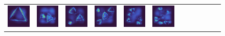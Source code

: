 \documentclass[letterpaper]{article} %
\begin{document}
\begin{figure}[!htbp]
\begin{tabular}{cccccccccccc}
\multicolumn{1}{c}{\includegraphics[width=0.125\columnwidth]{saliency/ce/circle/triangle_1.png}} \hspace{-12pt} &  \multicolumn{1}{c}{\includegraphics[width=0.125\columnwidth]{saliency/ce/circle/triangle_2.png}} \hspace{-12pt} & \multicolumn{1}{c}{\includegraphics[width=0.125\columnwidth]{saliency/ce/circle/triangle_3.png}} \hspace{-12pt} & \multicolumn{1}{c}{\includegraphics[width=0.125\columnwidth]{saliency/ce/circle/triangle_4.png}} \hspace{-12pt} & \multicolumn{1}{c}{\includegraphics[width=0.125\columnwidth]{saliency/ce/circle/triangle_5.png}} \hspace{-12pt} & \multicolumn{1}{c}{\includegraphics[width=0.125\columnwidth]{saliency/ce/circle/triangle_6.png}} \hspace{-12pt} & 

\end{tabular}
\end{figure}
\end{document}
